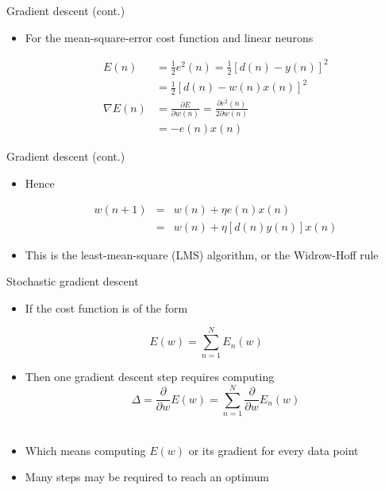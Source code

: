 \documentclass[notes]{beamer}
\providecommand{\tightlist}{%
  \setlength{\itemsep}{0pt}\setlength{\parskip}{0pt}}
\begin{document}
\begin{frame}{Gradient descent (cont.)}

\begin{itemize}
\tightlist
\item
  For the mean-square-error cost function and linear neurons

  \begin{equation*}
  \begin{aligned}
      E ( n ) & = \frac{1}{2} e^2 ( n ) = \frac{1}{2} [d ( n ) − y ( n )]^2  \\
      &= \frac{1}{2} [d ( n ) − w( n ) x ( n )]^2  \\
      \nabla E(n) &= \frac{\partial E}{\partial w(n)  }  = \frac{\partial e^2 (n)}{2 \partial w(n) } \\
      &= -e(n)x(n) 
  \end{aligned}
  \end{equation*}
\end{itemize}

\end{frame}

\begin{frame}{Gradient descent (cont.)}

\begin{itemize}
\tightlist
\item
  Hence

  \begin{eqnarray*}
  w( n + 1) &=& w( n ) +\eta  e( n ) x ( n ) \\ 
             &     =& w( n ) +\eta  [d ( n )  y ( n )] x ( n )
  \end{eqnarray*}
\item
  This is the least-mean-square (LMS) algorithm, or the Widrow-Hoff rule
\end{itemize}

\end{frame}

\begin{frame}{Stochastic gradient descent}

\begin{itemize}
\tightlist
\item
  If the cost function is of the form
\end{itemize}

\[E(w)=\sum_{n=1}^{N}E_n(w) \]

\begin{itemize}
\tightlist
\item
  Then one gradient descent step requires computing
  \[\Delta = \frac{\partial}{\partial w} E(w) =\sum_{n=1}^{N} \frac{\partial}{\partial w}E_n(w) \]\\
\item
  Which means computing \(E(w)\) or its gradient for every data point
\item
  Many steps may be required to reach an optimum
\end{itemize}

\end{frame}
\end{document}
